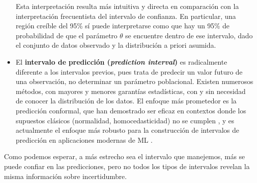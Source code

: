 \begin{itemize}
    Esta interpretación resulta más intuitiva y directa en comparación con la interpretación frecuentista del 
    intervalo de confianza. En particular, una región creíble del 95\% sí puede interpretarse como que hay un
    95\% de probabilidad de que el parámetro $\theta$ se encuentre dentro de ese intervalo, dado el conjunto
    de datos observado y la distribución a priori asumida.



    \item El \textbf{intervalo de predicción (\textit{prediction interval})} es radicalmente diferente a los 
    intervalos previos, pues trata de predecir un valor futuro de una observación, no determinar un parámetro 
    poblacional. Existen numerosos métodos, con mayores y menores garantías estadísticas, con y sin 
    necesidad de conocer la distribución de los datos. El enfoque más prometedor es la predicción conformal, 
    que han demostrado ser eficaz en contextos donde los supuestos clásicos (normalidad, homocedasticidad) no 
    se cumplen \cite{romano2019}, y es actualmente el enfoque más robusto para la construcción de intervalos 
    de predicción en aplicaciones modernas de ML 
    \cite{romano2019, luo2025, sadinle2019, romano2020, angelopoulos2020}.

\end{itemize}




Como podemos esperar, a más estrecho sea el intervalo que manejemos, más se puede confiar en las predicciones,
pero no todos los tipos de intervalos revelan la misma información sobre incertidumbre. 


